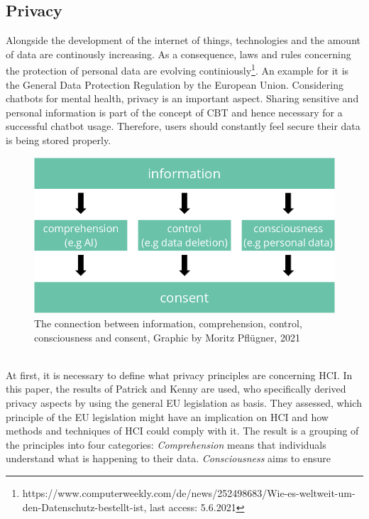 \documentclass[sigconf, nonacm]{acmart}
\begin{document}
\subsection{Privacy}
\label{sec:three_one}
Alongside the development of the internet of things, technologies and the amount of data are continously increasing\cite{Reinsel2018}.
As a consequence, laws and rules concerning the protection of personal data are evolving continiously\footnote{https://www.computerweekly.com/de/news/252498683/Wie-es-weltweit-um-den-Datenschutz-bestellt-ist, last access: 5.6.2021}.
An example for it is the General Data Protection Regulation by the European Union. Considering chatbots for mental health, privacy is an important aspect. Sharing sensitive and personal information is part of the concept of CBT and hence necessary for a successful chatbot usage. Therefore, users should constantly feel secure their data is being stored properly. 
\begin{figure}[h]
  \centering
  \includegraphics[width=\linewidth]{privacy_base}
  \caption{The connection between information, comprehension, control, consciousness and consent, Graphic by Moritz Pflügner, 2021}
  \label{fig:privacy_base}
\end{figure}
\\
At first, it is necessary to define what privacy principles are concerning HCI. In this paper, the results of Patrick and Kenny \cite{Patrick2003} are used, who specifically derived privacy aspects by using the general EU legislation as basis.
They assessed, which principle of the EU legislation might have an implication on HCI and how methods and techniques of HCI could comply with it. The result is a grouping of the principles into four categories: \emph{Comprehension} means that individuals understand what is happening to their data. \emph{Consciousness} aims to ensure
\end{document}
